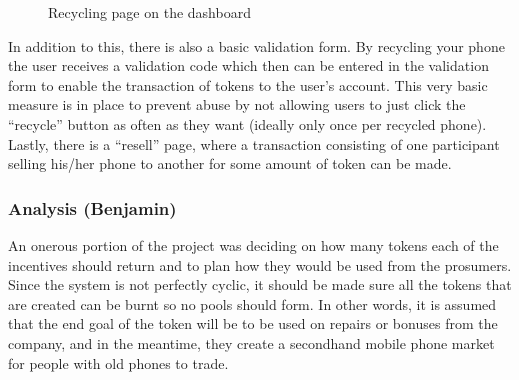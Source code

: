 \documentclass[11pt]{scrartcl}
\begin{document}
\begin{figure}[H]
    \caption{Recycling page on the dashboard}%
    \label{fig:recycle_web}
\end{figure}

In addition to this, there is also a basic validation form. By recycling your phone the user receives a validation code which then can be entered in the validation form to enable the transaction of tokens to the user's account. This very basic measure is in place to prevent abuse by not allowing users to just click the ``recycle'' button as often as they want (ideally only once per recycled phone). Lastly, there is a ``resell'' page, where a transaction consisting of one participant selling his/her phone to another for some amount of token can be made.

\subsubsection{Analysis (Benjamin)}

An onerous portion of the project was deciding on how many tokens each of the incentives should return and to plan how they would be used from the prosumers. Since the system is not perfectly cyclic, it should be made sure all the tokens that are created can be burnt so no pools should form. In other words, it is assumed that the end goal of the token will be to be used on repairs or bonuses from the company, and in the meantime, they create a secondhand mobile phone market for people with old phones to trade.
\end{document}
